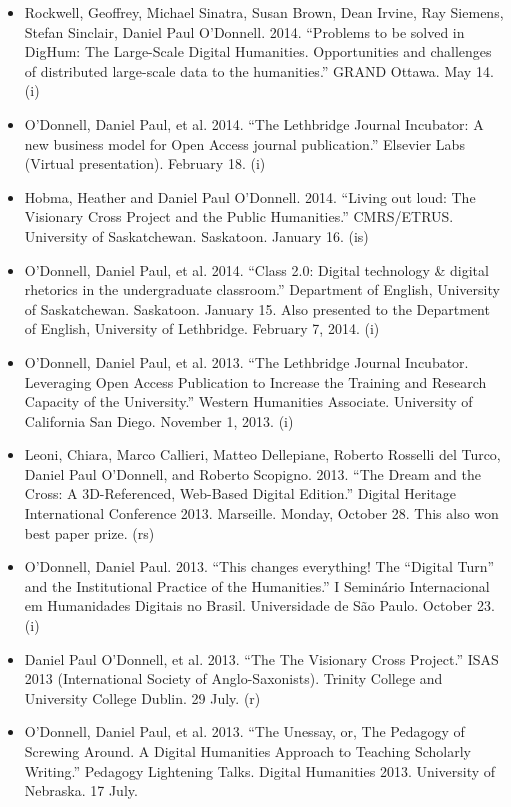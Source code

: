 \documentclass[12pt]{article}
\begin{document}
\begin{itemize}
  \item Rockwell, Geoffrey, Michael Sinatra, Susan Brown, Dean Irvine, Ray Siemens, Stefan Sinclair, Daniel Paul O'Donnell. 2014. “Problems to be solved in DigHum: The Large-Scale Digital Humanities. Opportunities and challenges of distributed large-scale data to the humanities.” GRAND Ottawa. May 14. (i)
  \item O'Donnell, Daniel Paul, et al. 2014. “The Lethbridge Journal Incubator: A new business model for Open Access journal publication.” Elsevier Labs (Virtual presentation). February 18. (i)
  \item Hobma\*, Heather and Daniel Paul O'Donnell. 2014. “Living out loud: The Visionary Cross Project and the Public Humanities.” CMRS/ETRUS. University of Saskatchewan. Saskatoon. January 16. (is)
  \item O'Donnell, Daniel Paul, et al. 2014. “Class 2.0: Digital technology \& digital rhetorics in the undergraduate classroom.” Department of English, University of Saskatchewan. Saskatoon. January  15. Also presented to the Department of English, University of Lethbridge. February 7, 2014. (i)
  \item O'Donnell, Daniel Paul, et al. 2013. “The Lethbridge Journal Incubator. Leveraging Open Access Publication to Increase the Training and Research Capacity of the University.” Western Humanities Associate. University of California San Diego. November 1, 2013. (i)
  \item Leoni\*, Chiara, Marco Callieri, Matteo Dellepiane, Roberto Rosselli del Turco, Daniel Paul O’Donnell, and Roberto Scopigno. 2013. “The Dream and the Cross: A 3D-Referenced, Web-Based Digital Edition.” Digital Heritage International Conference 2013. Marseille. Monday, October 28. This also won best paper prize. (rs)
  \item O'Donnell, Daniel Paul. 2013. “This changes everything! The “Digital Turn” and the Institutional Practice of the Humanities.” I Seminário Internacional em Humanidades Digitais no Brasil. Universidade de São Paulo. October 23. (i)
  \item Daniel Paul O'Donnell, et al. 2013. “The The Visionary Cross Project.” ISAS 2013 (International Society of Anglo-Saxonists). Trinity College and University College Dublin.  29 July. (r)
  \item O'Donnell, Daniel Paul, et al. 2013. “The Unessay, or, The Pedagogy of Screwing Around. A Digital Humanities Approach to Teaching Scholarly Writing.” Pedagogy Lightening Talks. Digital Humanities 2013. University of Nebraska. 17 July.

\end{itemize}
\end{document}
